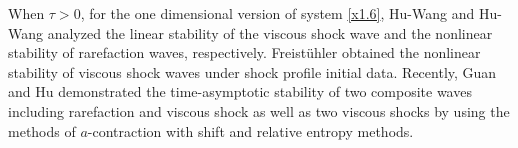 \documentclass[10pt,reqno]{amsart}
\numberwithin{equation}{section}
\begin{document}


When $\tau>0$, for the one dimensional version of system \eqref{x1.6}, Hu-Wang \cite{ZWH} and Hu-Wang \cite{XFH} analyzed the linear stability of the viscous shock wave and the nonlinear stability of rarefaction waves, respectively.  Freist\"uhler \cite{FRE1} obtained the nonlinear stability of viscous shock waves under shock profile initial data. Recently, Guan and Hu \cite{GHSR, GHSS} demonstrated the time-asymptotic stability of two composite waves including rarefaction and viscous shock as well as two viscous shocks by using the methods of $a$-contraction with shift and relative entropy methods.  %
\end{document}
